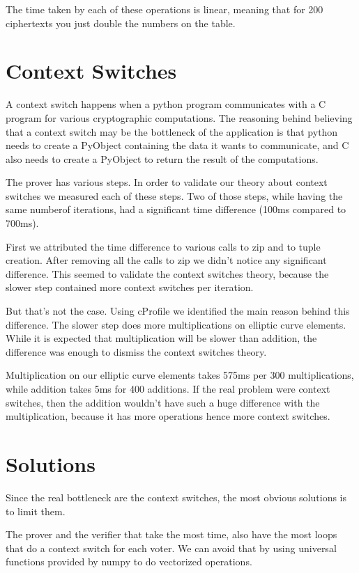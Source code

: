 \documentclass{article}
\begin{document}
The time taken by each of these operations is linear, meaning that for
200 ciphertexts you just double the numbers on the table.

\section{Context Switches}

A context switch happens when a python program communicates with a C
program for various cryptographic computations. The reasoning behind
believing that a context switch may be the bottleneck of the application
is that python needs to create a PyObject containing the
data it wants to communicate, and C also needs to create a PyObject to
return the result of the computations.

The prover has various steps. In order to validate our theory about context
switches we measured each of these steps. Two of those steps, while having
the same numberof iterations, had a significant time difference
(100ms compared to 700ms).

First we attributed the time difference to various calls to zip and to tuple
creation. After removing all the calls to zip we didn't notice any significant
difference. This seemed to validate the context switches theory, because the
slower step contained more context switches per iteration.

But that's not the case. Using cProfile we identified the main
reason behind this difference. The slower step does more multiplications on
elliptic curve elements. While it is expected that multiplication will be slower
than addition, the difference was enough to dismiss the context switches theory.

Multiplication on our elliptic curve elements takes 575ms per 300
multiplications, while addition takes 5ms for 400 additions. If the real
problem were context switches, then the addition wouldn't have such a huge
difference with the multiplication, because it has more operations hence
more context switches.


\section{Solutions}

Since the real bottleneck are the context switches, the most obvious
solutions is to limit them. 

The prover and the verifier that take the most time, also have the
most loops that do a context switch for each voter. We can avoid that
by using universal functions provided by numpy\cite{numpy} to do
vectorized operations.




\end{document}
